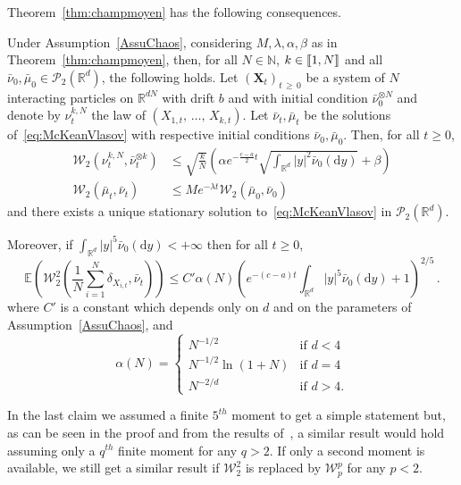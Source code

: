 \documentclass[10pt]{amsart}
\theoremstyle{definition}\newtheorem{defi}[theo]{Definition}\newtheorem{rema}[theo]{Remark}\newtheorem{exam}[theo]{Example}\newtheorem{exem}[theo]{Example}\newtheorem{nota}[theo]{Notation}
\newcommand{\llbracket}{\mathopen{[\mkern -2.7mu[}}
\newcommand{\rrbracket}{\mathclose{]\mkern -2.7mu]}}
\newcommand{\R}{\mathbb R}
\newcommand{\bbE}{\mathbb E}
\newcommand{\clP}{\mathcal P}
\newcommand{\clW}{\mathcal W}
\newcommand{\N}{\mathbb N}
\newcommand{\dd}{\mathrm{d}}
\newcommand{\1}{\mathbbm{1}}
\newcommand{\bX}{\mathbf{X}}
\providecommand{\llbracket}{\mathopen{[\mkern-2.7mu[}}\providecommand{\rrbracket}{\mathclose{]\mkern-2.7mu]}}
\begin{document}
Theorem~\ref{thm:champmoyen} has the following consequences.

\begin{coro}
Under Assumption~\ref{AssuChaos}, considering $M,\lambda,\alpha,\beta$ as in Theorem~\ref{thm:champmoyen}, then, for all $N\in \N$, $k\in\llbracket 1,N\rrbracket$ and all $\bar \nu_0,\bar \mu_0 \in \clP_2(\R^d)$, the following holds. Let $(\bX_t)_{t\,\geqslant\,0}$ be a system of $N$ interacting particles on $\R^{dN}$ with drift $b$ and with initial condition $\bar \nu_0^{\otimes N}$ and denote by $\nu_t^{k,N}$ the law of $(X_{1,t},\,\dots,\, X_{k,t})$. Let $\bar \nu_t,\bar \mu_t$ be the solutions of~\eqref{eq:McKeanVlasov} with respective initial conditions $\bar\nu_0,\bar\mu_0$. Then, for all $t\geqslant 0$,
\begin{align*}
\clW_2\left( \nu_t^{k,N},\bar \nu_t^{\otimes k}\right) &\leqslant \sqrt{\frac{k}{N}} \left( \alpha e^{-\frac{c-a}{2}t}\sqrt{\int_{\R^d} |y|^2 \bar \nu_0(\dd y)} + \beta\right) \\
\clW_2\left(\bar \mu_t,\bar \nu_t\right) &\leqslant M e^{-\lambda t} \clW_2\left(\bar \mu_0,\bar \nu_0\right)
\end{align*}
and there exists a unique stationary solution to~\eqref{eq:McKeanVlasov} in $\clP_2(\R^d)$.

Moreover, if $\int_{\R^d} |y|^5 \bar \nu_0(\dd y)<+\infty$ then for all $t\geqslant 0$,
\[
\bbE \left( \clW_2^2 \left( \frac1N \sum_{i=1}^N \delta_{X_{i,t}}, \bar\nu_t\right) \right) \leqslant C'\alpha(N)\left( e^{-(c-a)t}\int_{\R^d} |y|^5 \bar \nu_0(\dd y) + 1\right)^{2/5}\,.
\]
where $C'$ is a constant which depends only on $d$ and on the parameters of Assumption~\ref{AssuChaos}, and
\[
\alpha(N) = \left\{
\begin{array}{ll}
N^{-1/2} & \text{if } d<4\\
N^{-1/2}\ln(1+N) & \text{if }d=4\\
N^{-2/d} & \text{if }d>4.
\end{array}\right.
\]
\end{coro}

In the last claim we assumed a finite $5^{th}$ moment to get a simple statement but, as can be seen in the proof and from the results of~\cite{FournierGuillin}, a similar result would hold assuming only a $q^{th}$ finite moment for any $q>2$. If only a second moment is available, we still get a similar result if $\clW_2^2$ is replaced by $\clW_p^p$ for any $p<2$.
\end{document}
